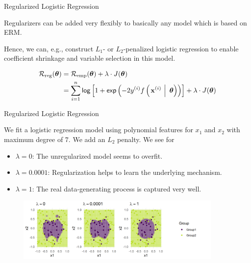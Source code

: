 \documentclass[11pt,compress,t,notes=noshow, xcolor=table]{beamer}
\begin{document}
\begin{vbframe}{Regularized Logistic Regression}

Regularizers can be added very flexibly to basically any model which is based on ERM.

\lz 

Hence, we can, e.g., construct $L_1$- or $L_2$-penalized logistic regression to enable coefficient shrinkage and variable selection in this model. 


\begin{align*}
\mathcal{R}_{\text{reg}}(\bm{\theta}) &= \mathcal{R}_{\text{emp}}(\bm{\theta}) + \lambda \cdot J(\bm{\theta}) \\
&= \sum\limits_{i=1}^n \mathsf{log}\left[1 + \mathsf{exp}\left(-2y^{(i)} f\left(\left.\mathbf{x}^{(i)}~\right|~ \bm{\theta}\right)\right)\right] + \lambda \cdot J(\bm{\theta})
\end{align*}


\end{vbframe}

\begin{vbframe}{Regularized Logistic Regression}


We fit a logistic regression model using polynomial features for \(x_1\)
and \(x_2\) with maximum degree of \(7\). We add an $L_2$ penalty. We
see for

\begin{itemize}

\item
  \(\lambda = 0\): The unregularized model seems to overfit.
\item
  \(\lambda = 0.0001\): Regularization helps to learn the underlying
  mechanism.
\item
  \(\lambda = 1\): The real data-generating process is captured very well.
\end{itemize}

\scriptsize

\begin{figure}
\includegraphics[width=0.9\textwidth]{figure/reg_logreg.png}\\
\end{figure}


\normalsize 

\end{vbframe}


\endlecture
\end{document}
